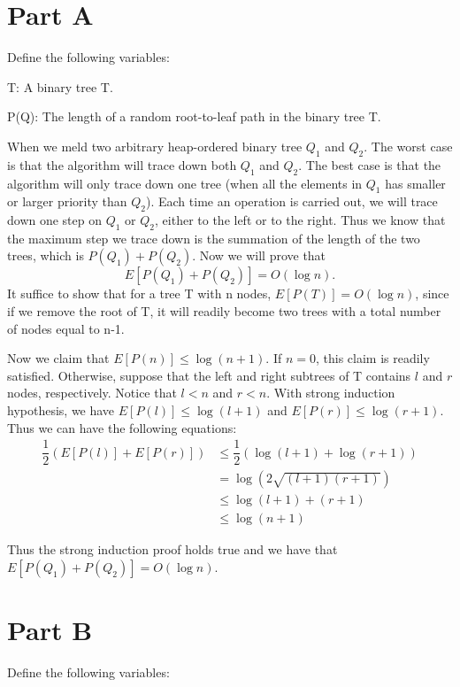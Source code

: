 \documentclass[11pt]{article}
\begin{document}


\section{Part A}
Define the following variables:

\noindent T: A binary tree T.

\noindent P(Q): The length of a random root-to-leaf path in the binary tree T.

\noindent  When we meld two arbitrary heap-ordered binary tree $Q_1$ and $Q_2$. The worst case is that the algorithm will trace down both $Q_1$ and $Q_2$. The best case is that the algorithm will only trace down one tree (when all the elements in $Q_1$ has smaller or larger priority than $Q_2$). Each time an operation is carried out, we will trace down one step on $Q_1$ or $Q_2$, either to the left or to the right. Thus we know that the maximum step we trace down is the summation of the length of the two trees, which is $P(Q_1)+P(Q_2)$. Now we will prove that 
\[
E[P(Q_1)+P(Q_2)]=O(\log{n}).
\] 
It suffice to show that for a tree T with n nodes, $E[P(T)]=O(\log{n})$, since if we remove the root of T, it will readily become two trees with a total number of nodes equal to n-1.

\noindent Now we claim that $E[P(n)]\leq \log{(n+1)}$. If $n=0$, this claim is readily satisfied. Otherwise, suppose that the left and right subtrees of T contains $l$ and $r$ nodes, respectively. Notice that $l < n$ and $r < n$. With strong induction hypothesis, we have $E[P(l)]\leq \log{(l+1)}$ and $E[P(r)]\leq \log{(r+1)}$. Thus we can have the following equations:
\begin{align*}
\dfrac{1}{2}(E[P(l)]+E[P(r)])
& \leq \dfrac{1}{2}(\log{(l+1)}+\log{(r+1)})\\
& =\log{(2\sqrt{(l+1)(r+1)})}\\
& \leq \log{(l+1)+(r+1)} \\
& \leq \log{(n+1)}
\end{align*}

Thus the strong induction proof holds true and we have that $E[P(Q_1)+P(Q_2)]=O(\log{n})$. 

\section{Part B}
Define the following variables:
\end{document}
